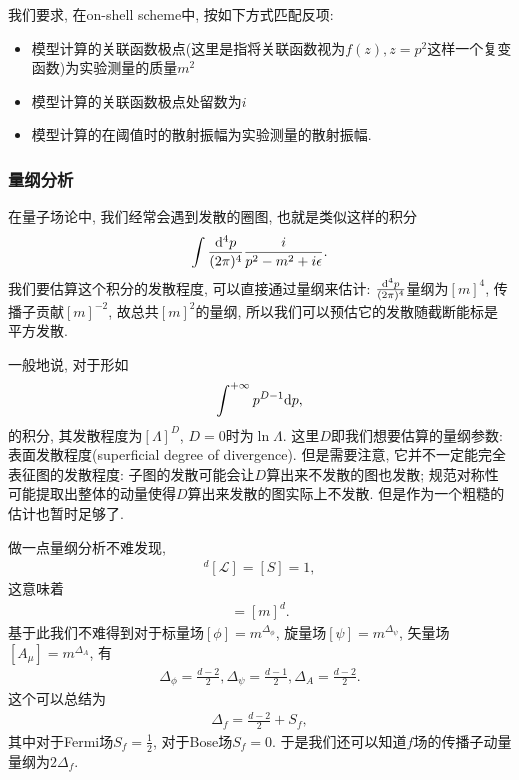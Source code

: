 \begin{definition}[on-shell方案]
    我们要求, 在on-shell scheme中, 按如下方式匹配反项:
    \begin{itemize}
        \item 模型计算的关联函数极点(这里是指将关联函数视为$f(z), z=p^2$这样一个复变函数)为实验测量的质量$m^2$
        \item 模型计算的关联函数极点处留数为$i$
        \item 模型计算的在阈值时的散射振幅为实验测量的散射振幅.
    \end{itemize}
\end{definition}

\subsubsection{量纲分析}
在量子场论中, 我们经常会遇到发散的圈图, 也就是类似这样的积分
\begin{align}
    \int\frac{\mathrm d^4p}{(2\pi)^4} \frac i{p^2-m^2+i\epsilon}.
\end{align}
我们要估算这个积分的发散程度, 可以直接通过量纲来估计: $\frac{\mathrm d^4p}{(2\pi)^4}$量纲为$[m]^4$, 传播子贡献$[m]^{-2}$, 故总共$[m]^2$的量纲, 所以我们可以预估它的发散随截断能标是平方发散. 

一般地说, 对于形如
\begin{align}
    \int^{+\infty} p^{D-1}\mathrm d p,
\end{align}
的积分, 其发散程度为$[\Lambda]^{D}$, $D=0$时为$\ln\Lambda$. 这里$D$即我们想要估算的量纲参数: 表面发散程度(superficial degree of divergence). 但是需要注意, 它并不一定能完全表征图的发散程度: 子图的发散可能会让$D$算出来不发散的图也发散; 规范对称性可能提取出整体的动量使得$D$算出来发散的图实际上不发散. 但是作为一个粗糙的估计也暂时足够了.

做一点量纲分析不难发现, 
\begin{align}
    [x]^d[\mathcal L]=[S]=1, 
\end{align}
这意味着
\begin{align}
    [\mathcal L]=[m]^d.
\end{align}
基于此我们不难得到对于标量场$[\phi]=m^{\Delta_\phi}$, 旋量场$[\psi]=m^{\Delta_\psi}$, 矢量场$[A_\mu]=m^{\Delta_A}$, 有
\begin{align}
    \Delta_\phi=\frac{d-2}2, \Delta_\psi=\frac{d-1}2, \Delta_A=\frac{d-2}2.
\end{align}
这个可以总结为
\begin{align}
    \Delta_f=\frac{d-2}2+S_f,
\end{align}
其中对于Fermi场$S_f=\frac12$, 对于Bose场$S_f=0$. 于是我们还可以知道$f$场的传播子动量量纲为$2\Delta_f$.

